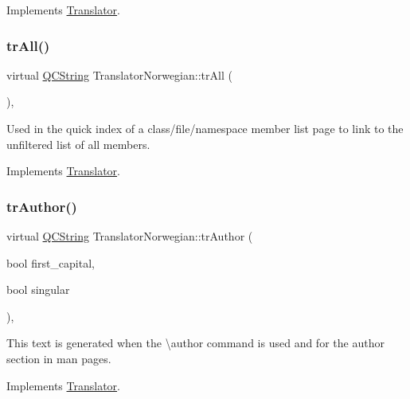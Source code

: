 Implements \mbox{\hyperlink{class_translator}{Translator}}.

\mbox{\label{class_translator_norwegian_a0d075dfe710b78a00bf505b0294d57e3}} 
\subsubsection{\texorpdfstring{trAll()}{trAll()}}
{\footnotesize\ttfamily virtual \mbox{\hyperlink{class_q_c_string}{Q\+C\+String}} Translator\+Norwegian\+::tr\+All (\begin{DoxyParamCaption}{ }\end{DoxyParamCaption})\hspace{0.3cm}{\ttfamily [inline]}, {\ttfamily [virtual]}}

Used in the quick index of a class/file/namespace member list page to link to the unfiltered list of all members. 

Implements \mbox{\hyperlink{class_translator}{Translator}}.

\mbox{\label{class_translator_norwegian_a8e2984e98ca9a2275203aa1a74dc9989}} 
\subsubsection{\texorpdfstring{trAuthor()}{trAuthor()}}
{\footnotesize\ttfamily virtual \mbox{\hyperlink{class_q_c_string}{Q\+C\+String}} Translator\+Norwegian\+::tr\+Author (\begin{DoxyParamCaption}\item[{bool}]{first\+\_\+capital,  }\item[{bool}]{singular }\end{DoxyParamCaption})\hspace{0.3cm}{\ttfamily [inline]}, {\ttfamily [virtual]}}

This text is generated when the \textbackslash{}author command is used and for the author section in man pages. 

Implements \mbox{\hyperlink{class_translator}{Translator}}.

\mbox{\label{class_translator_norwegian_aef08a3603e15397c3ba2d1f2c1acb446}} 
